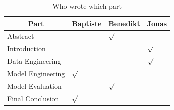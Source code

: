 \documentclass[a4paper]{article}
\begin{document}
\begin{table}
\caption{Who wrote which part}
\label{tbl:who}
\centering
\begin{tabular}{@{}llll@{}}
\toprule
\multicolumn{1}{c}{Part} & Baptiste   & Benedikt  & Jonas  \\ \midrule
Abstract                     			& & $\surd$  & \\
Introduction                 			&   &  & $\surd$ \\
Data Engineering             			&   &  & $\surd$ \\
Model Engineering 						& $\surd$ & & \\ 
Model Evaluation 						& & $\surd$  & \\
Final Conclusion						& $\surd$ & & \\ 
\bottomrule
\end{tabular}
\end{table}
\end{document}
